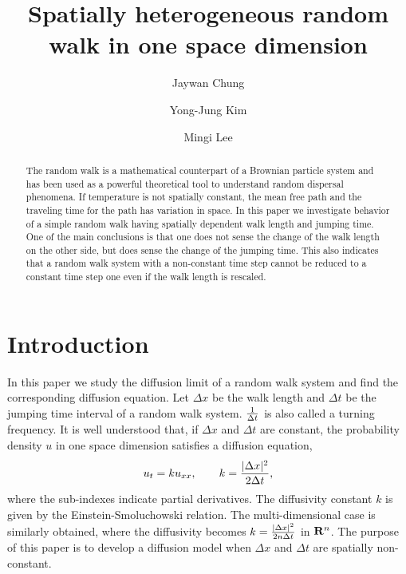 \documentclass[11pt]{amsart}
\title[Random walk with location dependent travelling time]{Spatially heterogeneous random walk in one space dimension}%
\author[Jaywan Chung]{Jaywan Chung}
\author[Yong-Jung Kim]{Yong-Jung Kim}
\author[Mingi Lee]{Mingi Lee}
\def\R{{\bf R}}
\def\R{{\bf R}}
\begin{document}
\maketitle
%
\begin{abstract}
  The random walk is a mathematical counterpart of a Brownian particle system and has been used as a powerful theoretical tool to understand random dispersal phenomena. If temperature is not spatially constant, the mean free path and the traveling time for the path has variation in space. In this paper we investigate behavior of a simple random walk having spatially dependent walk length and jumping time. One of the main conclusions is that one does not sense the change of the walk length on the other side, but does sense the change of the jumping time. This also indicates that a random walk system with a non-constant time step cannot be reduced to a constant time step one even if the walk length is rescaled.
\end{abstract}




\section{Introduction}

In this paper we study the diffusion limit of a random walk system and find the corresponding diffusion equation. Let $\Delta x$ be the walk length and $\Delta t$ be the jumping time interval of a random walk system. ${1\over\Delta t}$ is also called a turning frequency. It is well understood that, if $\Delta x$ and $\Delta t$ are constant, the probability density $u$ in one space dimension satisfies a diffusion equation,
\begin{equation}\label{HomoDiffusion}
u_t=ku_{xx},\qquad k={|\Delta x|^2\over 2\Delta t},
\end{equation}
where the sub-indexes indicate partial derivatives. The diffusivity constant $k$ is given by the Einstein-Smoluchowski relation. The multi-dimensional case is similarly obtained, where the diffusivity becomes $k={|\Delta x|^2\over 2n\Delta t}$ in $\R^n$. The purpose of this paper is to develop a diffusion model when $\Delta x$ and $\Delta t$ are spatially non-constant.
\end{document}
